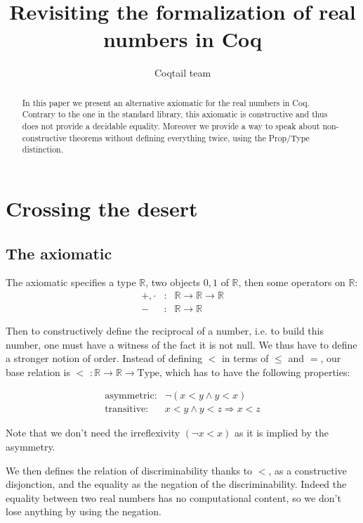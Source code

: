 \documentclass[a4paper,10pt]{article}
\title{Revisiting the formalization of real numbers in Coq}
\author{Coqtail team}
\newcommand{\R}{\mathbb{R}}
\newcommand{\Type}{\mbox{Type}}
\begin{document}
\maketitle

\begin{abstract}
	In this paper we present an alternative axiomatic for the real 
	numbers in Coq. Contrary to the one in the standard library, this 
	axiomatic is constructive and thus does not provide a decidable 
	equality. Moreover we provide a way to speak about non-constructive
	theorems without defining everything twice, using the Prop/Type
	distinction.
\end{abstract}

\section{Crossing the desert}

\subsection{The axiomatic}
  
  The axiomatic specifies a type $\R$, two objects $0,1$ of $\R$, then some operators on $\R$:
  \[
  \begin{array}{ccl}
  +, \cdot & : & \R→\R→\R \\
  -    & : & \R → \R
  \end{array}
  \]
  
  Then to constructively define the reciprocal of a number, i.e. to build this number, one must have a witness of the fact it is not null. We thus have to define a stronger notion of order. Instead of defining $<$ in terms of $≤$ and $=$, our base relation is $<\,\,:\R→\R→\Type$, which has to have the following properties:
  
  \[
  \begin{array}{ccl}
    \mbox{asymmetric:} & ¬(x<y \wedge y<x)\\
    \mbox{transitive:} & x<y \wedge y<z \Rightarrow x<z
  \end{array}
  \]
  
  Note that we don't need the irreflexivity $(¬x<x)$ as it is implied by the asymmetry.
  
  We then defines the relation of discriminability thanks to $<$, as a constructive disjonction, and the equality as the negation of the discriminability. Indeed the equality between two real numbers has no computational content, so we don't lose anything by using the negation.
  
\end{document}
